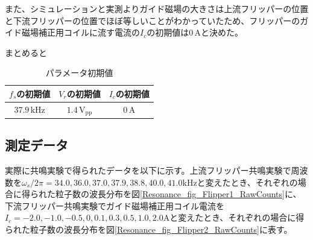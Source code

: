 また、シミュレーションと実測よりガイド磁場の大きさは上流フリッパーの位置と下流フリッパーの位置でほぼ等しいことがわかっていたため、フリッパーのガイド磁場補正用コイルに流す電流の$I_c$の初期値は$0\,\mathrm{A}$と決めた。

まとめると
\begin{table}[h]
\centering
\caption{パラメータ初期値}
\begin{tabular}{ccc}
$f_s$の初期値&$V_r$の初期値&$I_c$の初期値 \\ \hline
$37.9\,\mathrm{kHz}$&$1.4 \,\mathrm{V_{pp}}$&$0\,\mathrm{A}$
\end{tabular}
\end{table}

\subsection{測定データ}
実際に共鳴実験で得られたデータを以下に示す。上流フリッパー共鳴実験で周波数を$\omega_s/2\pi=34.0,36.0,37.0,37.9,38.8,40.0,41.0$kHzと変えたとき、それぞれの場合に得られた粒子数の波長分布を図\ref{Resonance_fig_Flipper1_RawCounts}に、下流フリッパー共鳴実験でガイド磁場補正用コイル電流を$I_c=-2.0,-1.0,-0.5,0,0.1,0.3,0.5,1.0,2.0$Aと変えたとき、それぞれの場合に得られた粒子数の波長分布を図\ref{Resonance_fig_Flipper2_RawCounts}に表す。

